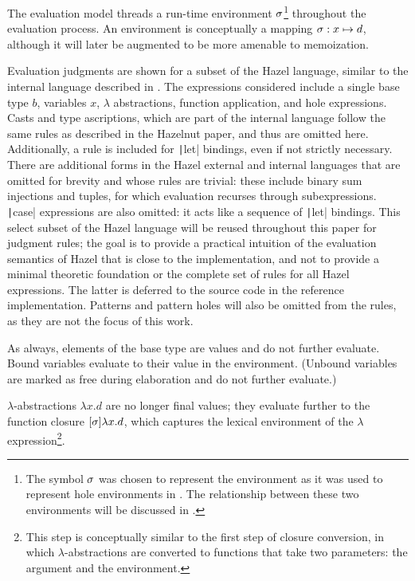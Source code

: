The evaluation model threads a run-time environment $\sigma$\footnote{The symbol $\sigma$ was chosen to represent the environment as it was used to represent hole environments in \cite{conf/popl/HazelnutLive19}. The relationship between these two environments will be discussed in .} throughout the evaluation process. An environment is conceptually a mapping $\sigma:x\mapsto d$, although it will later be augmented to be more amenable to memoization.

Evaluation judgments are shown for a subset of the Hazel language, similar to the internal language described in \cite{conf/popl/HazelnutLive19}. The expressions considered include a single base type $b$, variables $x$, $\lambda$ abstractions, function application, and hole expressions. Casts and type ascriptions, which are part of the internal language follow the same rules as described in the Hazelnut paper, and thus are omitted here. Additionally, a rule is included for \texttt|let| bindings, even if not strictly necessary. There are additional forms in the Hazel external and internal languages that are omitted for brevity and whose rules are trivial: these include binary sum injections and tuples, for which evaluation recurses through subexpressions. \texttt|case| expressions are also omitted: it acts like a sequence of \texttt|let| bindings. This select subset of the Hazel language will be reused throughout this paper for judgment rules; the goal is to provide a practical intuition of the evaluation semantics of Hazel that is close to the implementation, and not to provide a minimal theoretic foundation or the complete set of rules for all Hazel expressions. The latter is deferred to the source code in the reference implementation. Patterns and pattern holes will also be omitted from the rules, as they are not the focus of this work.

As always, elements of the base type are values and do not further evaluate. Bound variables evaluate to their value in the environment. (Unbound variables are marked as free during elaboration and do not further evaluate.)

$\lambda$-abstractions $\lambda x.d$ are no longer final values; they evaluate further to the function closure $[\sigma]\lambda x.d$, which captures the lexical environment of the $\lambda$ expression\footnote{This step is conceptually similar to the first step of closure conversion, in which $\lambda$-abstractions are converted to functions that take two parameters: the argument and the environment.}.

